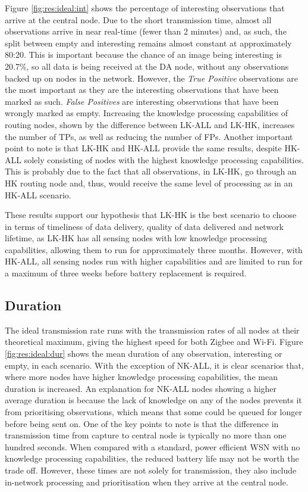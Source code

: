 Figure \ref{fig:res:ideal:int} shows the percentage of interesting observations that arrive at the central node. Due to the short transmission time, almost all observations arrive in near real-time (fewer than 2 minutes) and, as such, the split between empty and interesting remains almost constant at approximately 80:20. This is important because the chance of an image being interesting is 20.7\%, so all data is being received at the DA node, without any observations backed up on nodes in the network. However, the \textit{True Positive} observations are the most important as they are the interesting observations that have been marked as such. \textit{False Positives} are interesting observations that have been wrongly marked as empty. Increasing the knowledge processing capabilities of routing nodes, shown by the difference between LK-ALL and LK-HK, increases the number of TPs, as well as reducing the number of FPs. Another important point to note is that LK-HK and HK-ALL provide the same results, despite HK-ALL solely consisting of nodes with the highest knowledge processing capabilities.  This is probably due to the fact that all observations, in LK-HK, go through an HK routing node and, thus, would receive the same level of processing as in an HK-ALL scenario.

These results support our hypothesis that LK-HK is the best scenario to choose in terms of timeliness of data delivery, quality of data delivered and network lifetime, as LK-HK has all sensing nodes with low knowledge processing capabilities, allowing them to run for approximately three months. However, with HK-ALL, all sensing nodes run with higher capabilities and are limited to run for a maximum of three weeks before battery replacement is required.

\subsection{Duration}
The ideal transmission rate runs with the transmission rates of all nodes at their theoretical maximum, giving the highest speed for both Zigbee and Wi-Fi. Figure \ref{fig:res:ideal:dur} shows the mean duration of any observation, interesting or empty, in each scenario. With the exception of NK-ALL, it is clear scenarios that, where more nodes have higher knowledge processing capabilities, the mean duration is increased. An explanation for NK-ALL nodes showing a higher average duration is because the lack of knowledge on any of the nodes prevents it from prioritising observations, which means that some could be queued for longer before being sent on. One of the key points to note is that the difference in transmission time from capture to central node is typically no more than one hundred seconds. When compared with a standard, power efficient WSN with no knowledge processing capabilities, the reduced battery life may not be worth the trade off. However, these times are not solely for transmission, they also include in-network processing and prioritisation when they arrive at the central node. 

